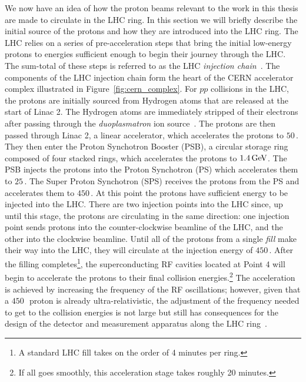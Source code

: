 We now have an idea of how the proton beams relevant to the work
in this thesis are made to circulate in the LHC ring.
In this section we will briefly describe the initial source of the protons and how
they are introduced into the LHC ring.
The LHC relies on a series of pre-acceleration steps that bring the initial
low-energy protons to energies sufficient enough to begin their journey through the LHC.
The sum-total of these steps is referred to as the LHC \textit{injection chain}~\cite{LHCDesignIII}.
The components of the LHC injection chain form the heart of the CERN accelerator
complex illustrated in Figure~\ref{fig:cern_complex}.
For $pp$ collisions in the LHC, the protons are initially sourced from Hydrogen atoms that are released
at the start of Linac 2.
The Hydrogen atoms are immediately stripped of their electrons after passing through
the \textit{duoplasmatron} ion source~\cite{Duoplasma}.
The protons are then passed through Linac 2, a linear accelerator, which accelerates
the protons to $50$\,\MeV.
They then enter the Proton Synchotron Booster (PSB), a circular storage ring
composed of four stacked rings, which accelerates the protons to $1.4\,\text{Ge\kern -0.1em V}$.
The PSB injects the protons into the Proton Synchotron (PS) which accelerates
them to $25$\,\GeV.
The Super Proton Synchotron (SPS) receives the protons from the PS and
accelerates them to $450$\,\GeV.
At this point the protons have sufficient energy to be injected into the LHC.
There are two injection points into the LHC since, up until this stage,
the protons are circulating in the same direction: one injection point sends
protons into the counter-clockwise beamline of the LHC, and the other
into the clockwise beamline.
Until all of the protons from a single \textit{fill} make their way into
the LHC, they will circulate at the injection energy of $450$\,\GeV.
After the filling completes\footnote{A standard LHC fill takes on the order of 4 minutes per
ring.}, the superconducting RF cavities located at Point 4 will begin to accelerate the protons
to their final collision energies.\footnote{If all goes smoothly, this acceleration stage takes roughly 20 minutes.}
The acceleration is achieved by increasing the frequency of the RF oscillations; however,
given that a $450$\,\GeV~proton is already ultra-relativistic, the adjustment of the frequency
needed to get to the collision energies is not large but still has consequences
for the design of the detector and measurement apparatus along the LHC ring~\cite{Boussard:410377}.

